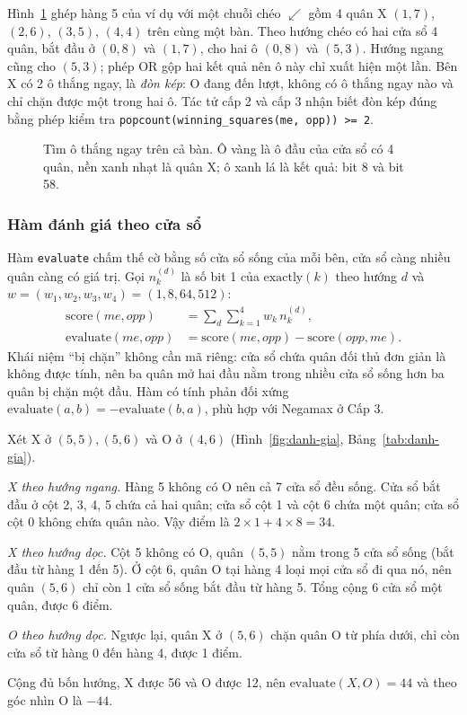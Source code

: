Hình~\ref{fig:o-thang} ghép hàng 5 của ví dụ với một chuỗi chéo $\swarrow$ gồm 4 quân X $(1,7)$, $(2,6)$, $(3,5)$, $(4,4)$ trên cùng một bàn. Theo hướng chéo có hai cửa sổ 4 quân, bắt đầu ở $(0,8)$ và $(1,7)$, cho hai ô $(0,8)$ và $(5,3)$. Hướng ngang cũng cho $(5,3)$; phép OR gộp hai kết quả nên ô này chỉ xuất hiện một lần. Bên X có 2 ô thắng ngay, là \emph{đòn kép}: O đang đến lượt, không có ô thắng ngay nào và chỉ chặn được một trong hai ô. Tác tử cấp 2 và cấp 3 nhận biết đòn kép đúng bằng phép kiểm tra \texttt{popcount(winning\_squares(me, opp)) >= 2}.

\begin{figure}[H]
  \centering
  
  \caption{Tìm ô thắng ngay trên cả bàn. Ô vàng là ô đầu của cửa sổ có 4 quân, nền xanh nhạt là quân X; ô xanh lá là kết quả: bit 8 và bit 58.}
  \label{fig:o-thang}
\end{figure}

\subsubsection{Hàm đánh giá theo cửa sổ}
\label{sec:bb-luong-gia}
Hàm \texttt{evaluate} chấm thế cờ bằng số cửa sổ sống của mỗi bên, cửa sổ càng nhiều quân càng có giá trị. Gọi $n_k^{(d)}$ là số bit 1 của $\mathrm{exactly}(k)$ theo hướng $d$ và $w = (w_1, w_2, w_3, w_4) = (1, 8, 64, 512)$:
\begin{align}
  \mathrm{score}(\mathit{me}, \mathit{opp}) &= \sum_{d} \sum_{k=1}^{4} w_k\, n_k^{(d)}, \\
  \mathrm{evaluate}(\mathit{me}, \mathit{opp}) &= \mathrm{score}(\mathit{me}, \mathit{opp}) - \mathrm{score}(\mathit{opp}, \mathit{me}).
\end{align}
Khái niệm ``bị chặn'' không cần mã riêng: cửa sổ chứa quân đối thủ đơn giản là không được tính, nên ba quân mở hai đầu nằm trong nhiều cửa sổ sống hơn ba quân bị chặn một đầu. Hàm có tính phản đối xứng $\mathrm{evaluate}(a, b) = -\mathrm{evaluate}(b, a)$, phù hợp với Negamax ở Cấp 3.

\begin{vidu}
Xét X ở $(5,5), (5,6)$ và O ở $(4,6)$ (Hình~\ref{fig:danh-gia}, Bảng~\ref{tab:danh-gia}).

\emph{X theo hướng ngang.} Hàng 5 không có O nên cả 7 cửa sổ đều sống. Cửa sổ bắt đầu ở cột 2, 3, 4, 5 chứa cả hai quân; cửa sổ cột 1 và cột 6 chứa một quân; cửa sổ cột 0 không chứa quân nào. Vậy điểm là $2 \times 1 + 4 \times 8 = 34$.

\emph{X theo hướng dọc.} Cột 5 không có O, quân $(5,5)$ nằm trong 5 cửa sổ sống (bắt đầu từ hàng 1 đến 5). Ở cột 6, quân O tại hàng 4 loại mọi cửa sổ đi qua nó, nên quân $(5,6)$ chỉ còn 1 cửa sổ sống bắt đầu từ hàng 5. Tổng cộng 6 cửa sổ một quân, được 6 điểm.

\emph{O theo hướng dọc.} Ngược lại, quân X ở $(5,6)$ chặn quân O từ phía dưới, chỉ còn cửa sổ từ hàng 0 đến hàng 4, được 1 điểm.

Cộng đủ bốn hướng, X được 56 và O được 12, nên $\mathrm{evaluate}(X, O) = 44$ và theo góc nhìn O là $-44$.
\end{vidu}

